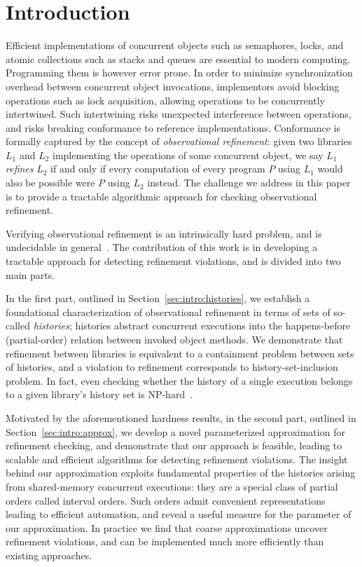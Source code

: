 \section{Introduction}

Efficient implementations of concurrent objects such as semaphores, locks,
and atomic collections such as stacks and queues are essential
to modern computing. Programming them is however error prone. In order to
minimize synchronization overhead between concurrent object invocations,
implementors avoid blocking operations such as lock acquisition, allowing
operations to be concurrently intertwined. Such intertwining risks unexpected
interference between operations, and risks breaking conformance to reference
implementations. Conformance is formally captured by the concept of
\emph{observational refinement}: given two libraries $L_1$ and $L_2$
implementing the operations of some concurrent object, we say $L_1$
\emph{refines} $L_2$ if and only if every computation of every program $P$
using $L_1$ would also be possible were $P$ using $L_2$ instead. The challenge
we address in this paper is to provide a tractable algorithmic approach for
checking observational refinement.

Verifying observational refinement is an intrinsically hard problem, and is
undecidable in general~\cite{conf/esop/BouajjaniEEH13}. The contribution of
this work is in developing a tractable approach for detecting refinement
violations, and is divided into two main parts.

In the first part, outlined in Section~\ref{sec:intro:histories}, we establish
a foundational characterization of observational refinement in terms of sets of
so-called \emph{histories}; histories abstract concurrent executions into the
happens-before (partial-order) relation between invoked object methods. We
demonstrate that refinement between libraries is equivalent to a containment
problem between sets of histories, and a violation to refinement corresponds to
history-set-inclusion problem. In fact, even checking whether the history of a
single execution belongs to a given library's history set is
NP-hard~\cite{journals/siamcomp/GibbonsK97}.

Motivated by the aforementioned hardness results, in the second part, outlined
in Section~\ref{sec:intro:approx}, we develop a novel parameterized
approximation for refinement checking, and demonstrate that our approach is
feasible, leading to scalable and efficient algorithms for detecting refinement
violations. The insight behind our approximation exploits fundamental
properties of the histories arising from shared-memory concurrent executions:
they are a special class of partial orders called interval orders. Such orders
admit convenient representations leading to efficient automation, and reveal a
useful measure for the parameter of our approximation. In practice we find that
coarse approximations uncover refinement violations, and can be implemented
much more efficiently than existing approaches.

